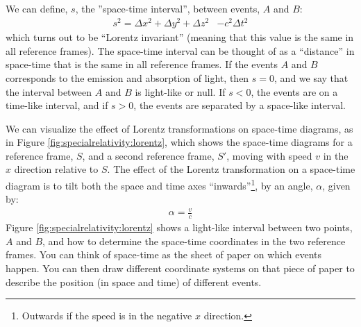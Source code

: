 We can define, $s$, the ''space-time interval'', between events, $A$ and $B$:
\begin{align*}
s^2 = \Delta x^2 + \Delta y^2 +\Delta z^2&-c^2\Delta t^2
\end{align*}
which turns out to be ``Lorentz invariant'' (meaning that this value is the same in all reference frames). The space-time interval can be thought of as a ``distance'' in space-time that is the same in all reference frames. If the events $A$ and $B$ corresponds to the emission and absorption of light, then $s=0$, and we say that the interval between $A$ and $B$ is light-like or null. If $s<0$, the events are on a time-like interval, and if $s>0$, the events are separated by a space-like interval.

We can visualize the effect of Lorentz transformations on space-time diagrams, as in Figure \ref{fig:specialrelativity:lorentz}, which shows the space-time diagrams for a reference frame, $S$, and a second reference frame, $S'$, moving with speed $v$ in the $x$ direction relative to $S$.
The effect of the Lorentz transformation on a space-time diagram is to tilt both the space and time axes ``inwards''\footnote{Outwards if the speed is in the negative $x$ direction.}, by an angle, $\alpha$, given by:
\begin{align*}
\alpha = \frac{v}{c}
\end{align*}
Figure \ref{fig:specialrelativity:lorentz} shows a light-like interval between two points, $A$ and $B$, and how to determine the space-time coordinates in the two reference frames. You can think of space-time as the sheet of paper on which events happen. You can then draw different coordinate systems on that piece of paper to describe the position (in space and time) of different events.

